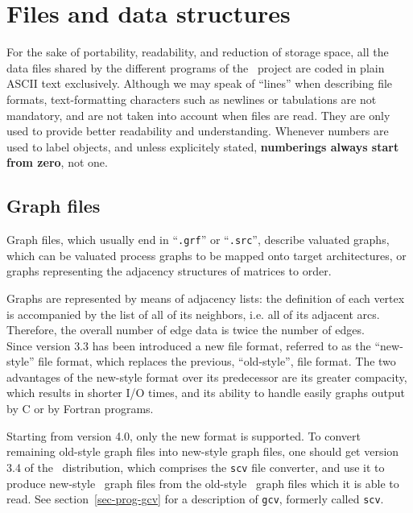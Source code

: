 
\section{Files and data structures}
\label{sec-file}

For the sake of portability, readability, and reduction of storage space,
all the data files shared by the different programs of the
\scotch\ project are coded in plain ASCII text exclusively.
Although we may speak of ``lines'' when describing file formats,
text-formatting characters such as newlines or tabulations are not
mandatory, and are not taken into account when files are read.
They are only used to provide better readability and understanding.
Whenever numbers are used to label objects, and unless explicitely
stated, \textbf{numberings always start from zero}, not one.

\subsection{Graph files}
\label{sec-file-sgraph}

Graph files, which usually end in ``\texttt{\@.grf}'' or
``\texttt{\@.src}'', describe valuated graphs, which can be valuated
process graphs to be mapped onto target architectures, or graphs
representing the adjacency structures of matrices to order.

Graphs are represented by means of adjacency lists: the definition
of each vertex is accompanied by the list of all of its neighbors, i.e.
all of its adjacent arcs. Therefore, the overall number of edge data is
twice the number of edges.
\\

Since version \textsc{3.3} has been introduced a new file format, referred
to as the ``new-style'' file format, which replaces the previous,
``old-style'', file format. The two advantages of the new-style
format over its predecessor are its greater compacity, which results
in shorter I/O times, and its ability to handle easily graphs output
by C or by Fortran programs.

Starting from version \textsc{4.0}, only the new format is supported. To
convert remaining old-style graph files into new-style graph files,
one should get version \textsc{3.4} of the \scotch\ distribution, which
comprises the \texttt{scv} file converter, and use it to produce
new-style \scotch\ graph files from the old-style \scotch\ graph files
which it is able to read. See section~\ref{sec-prog-gcv} for a
description of \texttt{gcv}, formerly called \texttt{scv}.
\\

